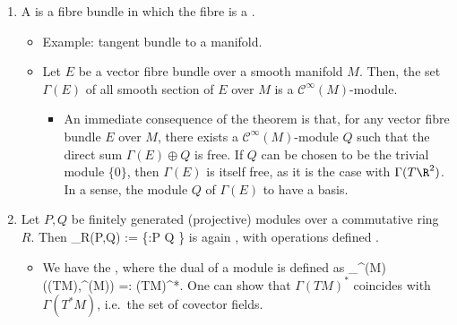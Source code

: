 \documentclass{article}
\newcommand{\cl}{:\text{ }}
\begin{document}
\begin{enumerate}
\begin{itemize}
    \item {}: A \footnote{Recall that the inverse of a bijective linear map is automatically linear.} is said to be a , and we write $M\cong_{\mathrm{mod}}N$ if there exists a module isomorphism between them.
    \item {} If $M$ and $N$ are right $R$-modules, then the linearity condition is written as
\bse
\forall \, r\in R : \forall \, m_1,m_2\in M : \ f(m_1r + m_2)=f(m_1)r+f(m_2).
\ese
\end{itemize}

\item {} 
A  is a fibre bundle in which the fibre is a . 
\begin{itemize}
    \item Example:  tangent bundle to a manifold.
    \item {} Let $E$ be a vector fibre bundle over a smooth manifold $M$. Then, the set $\Gamma(E)$ of all smooth section of $E$ over $M$ is a  $\mathcal{C}^\infty(M)$-module.
    \begin{itemize}[$\ast$]
        \item An immediate consequence of the theorem is that, for any vector fibre bundle $E$ over $M$, there exists a $\mathcal{C}^\infty(M)$-module $Q$ such that the direct sum $\Gamma(E)\oplus Q$ is free. If $Q$ can be chosen to be the trivial module $\{0\}$, then $\Gamma(E)$ is itself free, as it is the case with $\Gamma(T\R^2)$. In a sense, the module $Q$  of $\Gamma(E)$ to have a basis.
    \end{itemize}
\end{itemize}

\item {} Let $P,Q$ be finitely generated (projective) modules over a commutative ring $R$. Then
\bse
\Hom_R(P,Q) := \{\phi\cl P \xrightarrow{\sim} Q \mid \phi {}\}
\ese
is again , with operations defined .


\begin{itemize}
    \item {} We have the , where the dual of a module is defined as
\bse
\Hom_{^\infty(M)}(\Gamma(TM),^\infty(M)) =: \Gamma(TM)^*.
\ese
One can show that $\Gamma(TM)^*$ coincides with $\Gamma(T^*M)$, i.e.\ the set of covector fields.
\end{itemize}



\end{enumerate}
\end{document}
